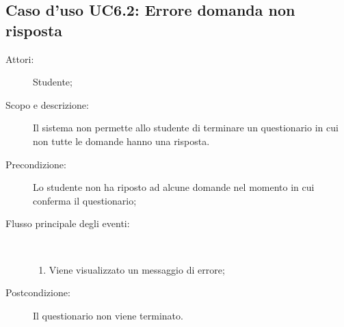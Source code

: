 \subsection{Caso d'uso UC6.2: Errore domanda non risposta}\begin{description}
	\item[Attori:] Studente;
	\item[Scopo e descrizione:] Il sistema non permette allo studente di terminare un questionario in cui non tutte le domande hanno una risposta.
	\item[Precondizione:] Lo studente non ha riposto ad alcune domande nel momento in cui conferma il questionario;
	
	\item[Flusso principale degli eventi:] \ 
	\begin{enumerate}
		\item Viene visualizzato un messaggio di errore;
		
	\end{enumerate}
	\item[Postcondizione:] Il questionario non viene terminato.
\end{description}
\hypertarget{UC6.3}{}
